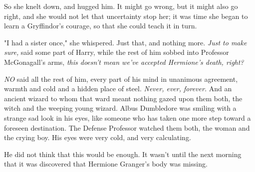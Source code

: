 So she knelt down, and hugged him. It might go wrong, but it might also go
right, and she would not let that uncertainty stop her; it was time she began
to learn a Gryffindor's courage, so that she could teach it in turn.

"I had a sister once," she whispered. Just that, and nothing more.
\sbreak
\emph{Just to make sure,} said some part of Harry, while the rest of him sobbed
into Professor McGonagall's arms, \emph{this doesn't mean we've accepted
Hermione's death, right?}

\emph{NO} said all the rest of him, every part of his mind in unanimous
agreement, warmth and cold and a hidden place of steel. \emph{Never, ever,
forever.}
\sbreak
And an ancient wizard to whom that ward meant nothing gazed upon them both, the
witch and the weeping young wizard. Albus Dumbledore was smiling with a strange
sad look in his eyes, like someone who has taken one more step toward a
foreseen destination.
\sbreak
The Defense Professor watched them both, the woman and the crying boy. His eyes
were very cold, and very calculating.

He did not think that this would be enough.
\sbreak
It wasn't until the next morning that it was discovered that Hermione Granger's
body was missing.
